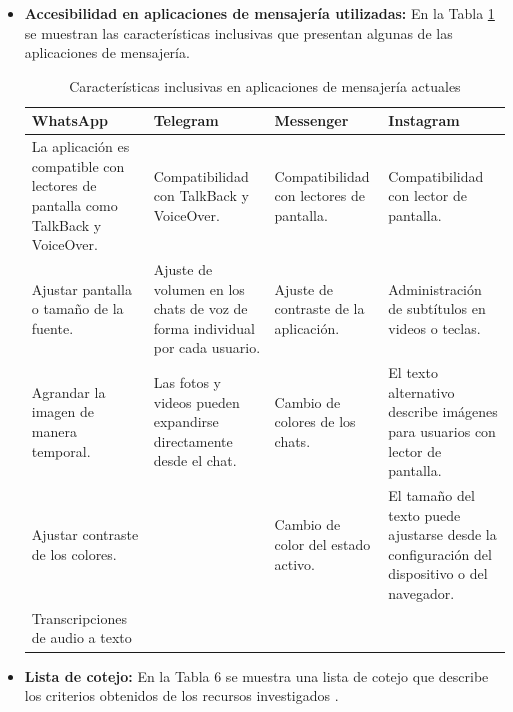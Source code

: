 \documentclass[lettersize,journal]{IEEEtran}
\begin{document}
\begin{itemize}
	
	\item \textbf{Accesibilidad en aplicaciones de mensajería utilizadas:} En la Tabla \ref{tab:caracteristicas-mensajeria} se muestran las características inclusivas que presentan algunas de las aplicaciones de mensajería. 
	
	
	\begin{table}[h!]
		\centering
		\caption{Características inclusivas en aplicaciones de mensajería actuales}
		\label{tab:caracteristicas-mensajeria}
		\begin{tabular}{|p{1.5cm}|p{1.5cm}|p{1.5cm}|p{1.5cm}|}
			\hline
			\textbf{WhatsApp} & \textbf{Telegram} & \textbf{Messenger} & \textbf{Instagram} \\
			\hline
			La aplicación es compatible con lectores de pantalla como TalkBack y VoiceOver. & Compatibilidad con TalkBack y VoiceOver. & Compatibilidad con lectores de pantalla. & Compatibilidad con lector de pantalla. \\
			\hline
			Ajustar pantalla o tamaño de la fuente. & Ajuste de volumen en los chats de voz de forma individual por cada usuario. & Ajuste de contraste de la aplicación. & Administración de subtítulos en videos o teclas. \\
			\hline
			Agrandar la imagen de manera temporal. & Las fotos y videos pueden expandirse directamente desde el chat. & Cambio de colores de los chats. & El texto alternativo describe imágenes para usuarios con lector de pantalla. \\
			\hline
			Ajustar contraste de los colores. & & Cambio de color del estado activo. & El tamaño del texto puede ajustarse desde la configuración del dispositivo o del navegador. \\
			\hline
			Transcripciones de audio a texto & & & \\
			\hline
		\end{tabular}
	\end{table}
	
	
	\item \textbf{Lista de cotejo:} En la Tabla 6 se muestra una lista de cotejo que describe los criterios obtenidos de los recursos investigados \cite{Swati2021,w3c2008,Ballantyne2018,AcostaVargas2020}.
	

\end{itemize}
\end{document}
